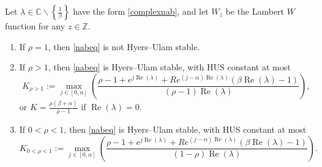 \documentclass[10pt,a4paper]{amsart}
\newcommand{\C}{\ensuremath{\mathbb{C}}}
\newcommand{\Z}{\ensuremath{\mathbb{Z}}}
\begin{document}
\begin{theorem}\label{complexTHMHUS}
Let $\lambda\in\C\backslash\left\{\frac{1}{\beta}\right\}$ have the form \eqref{complexnab}, and let $W_z$ be the Lambert $W$ function for any $z\in\Z$. 
\begin{enumerate}
\item If $\rho=1$, then \eqref{nabeq} is not Hyers--Ulam stable.
\item If $\rho>1$, then \eqref{nabeq} is Hyers--Ulam stable, with HUS constant at most 
\begin{equation}\label{KRbigger1}
 K_{\rho>1}:=\max_{j\in[0,\alpha]}\left(\frac{\rho-1+e^{j\operatorname{Re}(\lambda)}+Re^{(j-\alpha)\operatorname{Re}(\lambda)}\left(\beta\operatorname{Re}(\lambda)-1\right)}{(\rho-1)\operatorname{Re}(\lambda)}\right), 
\end{equation} 
or $K=\frac{\rho(\beta+\alpha)}{\rho-1}$ if $\operatorname{Re}(\lambda)=0$. 
\item If $0<\rho<1$, then \eqref{nabeq} is Hyers--Ulam stable, with HUS constant at most  
\begin{equation}\label{Krsmaller1}
 K_{0<\rho<1}:= \max_{j\in[0,\alpha]}\left(\frac{\rho-1+e^{j\operatorname{Re}(\lambda)}+Re^{(j-\alpha)\operatorname{Re}(\lambda)}\left(\beta\operatorname{Re}(\lambda)-1\right)}{(1-\rho)\operatorname{Re}(\lambda)}\right). 
\end{equation}
\end{enumerate}
\end{theorem}
\end{document}
